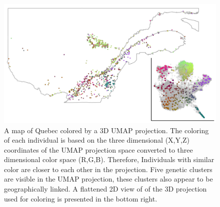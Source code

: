 \documentclass[
11pt, %
oneside, %
english, %
doublespacing, %
headsepline, %
chapterinoneline, %
]{MastersDoctoralThesis} %
\begin{document}
\begin{figure}
\includegraphics[width=\hsize,keepaspectratio]{./Figures/Genizon_BalSac_mapsInMaps4.jpg}

\caption{A map of Quebec colored by a 3D UMAP projection. 
The coloring of each individual is based on the three dimensional (X,Y,Z) coordinates of the UMAP projection space converted to three dimensional color space (R,G,B).
Therefore, Individuals with similar color are closer to each other in the projection.
Five genetic clusters are visible in the UMAP projection, these clusters also appear to be geographically linked. 
A flattened 2D view of of the 3D projection used for coloring is presented in the bottom right.}
\label{UMAP}
\end{figure}

\clearpage


%



\printbibliography[heading=bibintoc]

\end{document}
